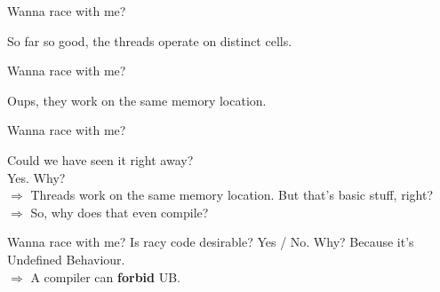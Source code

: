 \documentclass[handout]{beamer} %
\begin{document}
\begin{frame}{Wanna race with me?}
	\begin{center}
		\vfill
		So far so good, the threads operate on distinct cells.
	\end{center}
\end{frame}


\begin{frame}{Wanna race with me?}
	\begin{center}
		\vfill
		Oups, they work on the same memory location.
	\end{center}
\end{frame}


\begin{frame}{Wanna race with me?}
	\begin{center}
		Could we have seen it right away?\\
		\pause
		Yes.
		\vfill\pause
		Why?\\
		\pause
		$\Rightarrow$ Threads work on the same memory location.
		\vfill\pause
		But that's basic stuff, right?\\
		\pause
		{\color{red} $\Rightarrow$ So, why does that even compile?}
	\end{center}
\end{frame}


\begin{frame}{Wanna race with me?}
	Is racy code desirable?
	{Yes} / {No}.
	\vfill\pause
	Why?
	\pause
	Because it's Undefined Behaviour.\\
	$\Rightarrow$ A compiler can \textbf{forbid} UB.
\end{frame}
\end{document}
